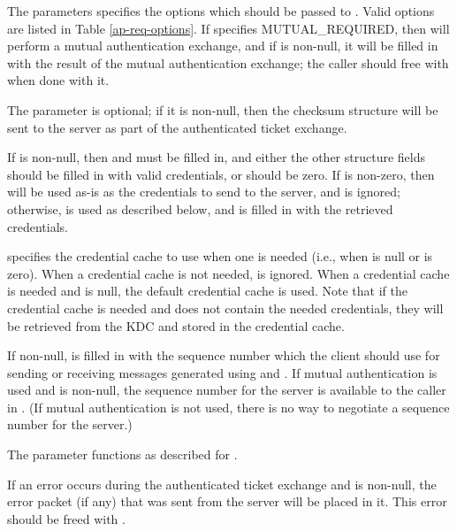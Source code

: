 The  parameters specifies the options which
should be passed to .  Valid options are listed
in Table \ref{ap-req-options}.  If 
specifies MUTUAL_REQUIRED, then  will perform
a mutual authentication exchange, and if  is
non-null, it will be filled in with the result of the mutual
authentication exchange; the caller should free
 with
 when done with it.

The  parameter is optional; if it is non-null,
then the checksum structure will be sent to the server as part of the
authenticated ticket exchange.

If  is non-null, then  and
 must be filled in, and either
the other structure fields should be filled in with valid credentials,
or  should be zero.  If
 is non-zero, then
 will be used as-is as the credentials to send to
the server, and  is ignored; otherwise,
 is used as described below, and 
is filled in with the retrieved credentials.

 specifies the credential cache to use when one is
needed (i.e., when  is null or
 is zero).  When a credential
cache is not needed,  is ignored.  When a credential
cache is needed and  is null, the default credential
cache is used.  Note that if the credential cache is needed and does
not contain the needed credentials, they will be retrieved from the
KDC and stored in the credential cache.

If non-null,  is filled in with the sequence number
which the client should use for sending or receiving messages generated
using  and .  If mutual
authentication is used and  is non-null, the
sequence number for the server is available to the caller in
.  (If mutual authentication is not
used, there is no way to negotiate a sequence number for the server.)

The  parameter functions as described for
.

If an error occurs during the authenticated ticket exchange and
 is non-null, the error packet (if any) that was sent
from the server will be placed in it.  This error should be freed with
.

